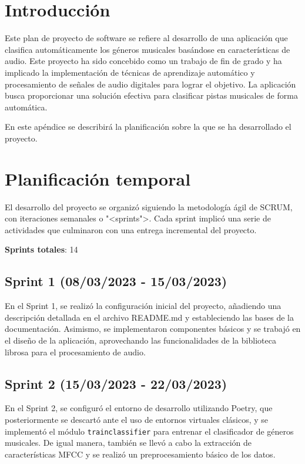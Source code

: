 
\section{Introducción}

Este plan de proyecto de software se refiere al desarrollo de una aplicación que clasifica automáticamente los géneros musicales basándose en características de audio. 
Este proyecto ha sido concebido como un trabajo de fin de grado y ha implicado la implementación de técnicas de aprendizaje automático y procesamiento de señales de audio digitales para lograr el objetivo.
La aplicación busca proporcionar una solución efectiva para clasificar pistas musicales de forma automática.

En este apéndice se describirá la planificación sobre la que se ha desarrollado el proyecto.

\section{Planificación temporal}

El desarrollo del proyecto se organizó siguiendo la metodología ágil de SCRUM, con iteraciones semanales o "<sprints">. 
Cada sprint implicó una serie de actividades que culminaron con una entrega incremental del proyecto.

\textbf{Sprints totales}: 14

\subsection{Sprint 1 (08/03/2023 - 15/03/2023)}

En el Sprint 1, se realizó la configuración inicial del proyecto, añadiendo una descripción detallada en el archivo README.md y estableciendo las bases de la documentación. Asimismo, se implementaron componentes básicos y se trabajó en el diseño de la aplicación, aprovechando las funcionalidades de la biblioteca librosa para el procesamiento de audio.

\subsection{Sprint 2 (15/03/2023 - 22/03/2023)}

En el Sprint 2, se configuró el entorno de desarrollo utilizando Poetry, que posteriormente se descartó ante el uso de entornos virtuales clásicos, y se implementó el módulo \texttt{train\textunderscore classifier} para entrenar el clasificador de géneros musicales. De igual manera, también se llevó a cabo la extracción de características MFCC y se realizó un preprocesamiento básico de los datos.

